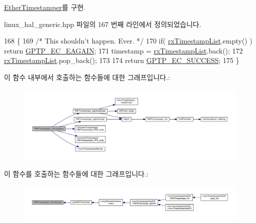 \hyperlink{class_ether_timestamper_afcc61feb25861ff20edbb657170a3c9e}{Ether\+Timestamper}를 구현.



linux\+\_\+hal\+\_\+generic.\+hpp 파일의 167 번째 라인에서 정의되었습니다.


\begin{DoxyCode}
168                                          \{
169         \textcolor{comment}{/* This shouldn't happen. Ever. */}
170         \textcolor{keywordflow}{if}( \hyperlink{class_linux_timestamper_generic_a3ab5f699ce3a90c21782087bdae99de9}{rxTimestampList}.empty() ) \textcolor{keywordflow}{return} \hyperlink{ieee1588_8hpp_aee74e806e4f7deb78c6adee61f5dac87}{GPTP\_EC\_EAGAIN};
171         timestamp = \hyperlink{class_linux_timestamper_generic_a3ab5f699ce3a90c21782087bdae99de9}{rxTimestampList}.back();
172         \hyperlink{class_linux_timestamper_generic_a3ab5f699ce3a90c21782087bdae99de9}{rxTimestampList}.pop\_back();
173 
174         \textcolor{keywordflow}{return} \hyperlink{ieee1588_8hpp_a57ed3a54df25c6db88b00f685f517920}{GPTP\_EC\_SUCCESS};
175     \}
\end{DoxyCode}


이 함수 내부에서 호출하는 함수들에 대한 그래프입니다.\+:
\nopagebreak
\begin{figure}[H]
\begin{center}
\leavevmode
\includegraphics[width=350pt]{class_linux_timestamper_generic_a9dc0ab7dd51322bf334ba8fe1d4e77a9_cgraph}
\end{center}
\end{figure}




이 함수를 호출하는 함수들에 대한 그래프입니다.\+:
\nopagebreak
\begin{figure}[H]
\begin{center}
\leavevmode
\includegraphics[width=350pt]{class_linux_timestamper_generic_a9dc0ab7dd51322bf334ba8fe1d4e77a9_icgraph}
\end{center}
\end{figure}


